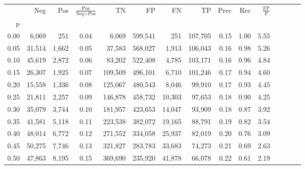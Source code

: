 \begin{tabular}{rrrcrrrrrrrrrrr}
\toprule
{} &     Neg &     Pos & $\frac{\text{Pos}}{\text{Neg}+\text{Pos}}$ &       TN &       FP &       FN &       TP &  Prec &   Rec & $\frac{\text{FP}}{\text{P}}$ \\
p    &         &         &                                            &          &          &          &          &       &       &                              \\
\midrule
0.00 &   6,069 &     251 &                                       0.04 &    6,069 &  599,541 &      251 &  107,705 &  0.15 &  1.00 &                         5.55 \\
0.05 &  31,514 &   1,662 &                                       0.05 &   37,583 &  568,027 &    1,913 &  106,043 &  0.16 &  0.98 &                         5.26 \\
0.10 &  45,619 &   2,872 &                                       0.06 &   83,202 &  522,408 &    4,785 &  103,171 &  0.16 &  0.96 &                         4.84 \\
0.15 &  26,307 &   1,925 &                                       0.07 &  109,509 &  496,101 &    6,710 &  101,246 &  0.17 &  0.94 &                         4.60 \\
0.20 &  15,558 &   1,336 &                                       0.08 &  125,067 &  480,543 &    8,046 &   99,910 &  0.17 &  0.93 &                         4.45 \\
0.25 &  21,811 &   2,257 &                                       0.09 &  146,878 &  458,732 &   10,303 &   97,653 &  0.18 &  0.90 &                         4.25 \\
0.30 &  35,079 &   3,744 &                                       0.10 &  181,957 &  423,653 &   14,047 &   93,909 &  0.18 &  0.87 &                         3.92 \\
0.35 &  41,581 &   5,118 &                                       0.11 &  223,538 &  382,072 &   19,165 &   88,791 &  0.19 &  0.82 &                         3.54 \\
0.40 &  48,014 &   6,772 &                                       0.12 &  271,552 &  334,058 &   25,937 &   82,019 &  0.20 &  0.76 &                         3.09 \\
0.45 &  50,275 &   7,746 &                                       0.13 &  321,827 &  283,783 &   33,683 &   74,273 &  0.21 &  0.69 &                         2.63 \\
0.50 &  47,863 &   8,195 &                                       0.15 &  369,690 &  235,920 &   41,878 &   66,078 &  0.22 &  0.61 &                         2.19 \\

\end{tabular}
